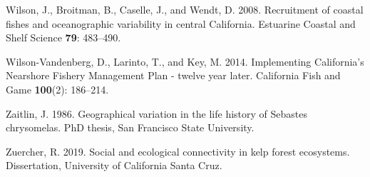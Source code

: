 \documentclass[12pt,]{article}
\begin{document}
\hypertarget{ref-Wilson2008}{}
Wilson, J., Broitman, B., Caselle, J., and Wendt, D. 2008. Recruitment
of coastal fishes and oceanographic variability in central California.
Estuarine Coastal and Shelf Science \textbf{79}: 483--490.

\hypertarget{ref-Vandenberg2014}{}
Wilson-Vandenberg, D., Larinto, T., and Key, M. 2014. Implementing
California's Nearshore Fishery Management Plan - twelve year later.
California Fish and Game \textbf{100}(2): 186--214.

\hypertarget{ref-Zaitlin1986}{}
Zaitlin, J. 1986. Geographical variation in the life history of Sebastes
chrysomelas. PhD thesis, San Francisco State University.

\hypertarget{ref-Zuercher2019}{}
Zuercher, R. 2019. Social and ecological connectivity in kelp forest
ecosystems. Dissertation, University of California Santa Cruz.
\end{document}
